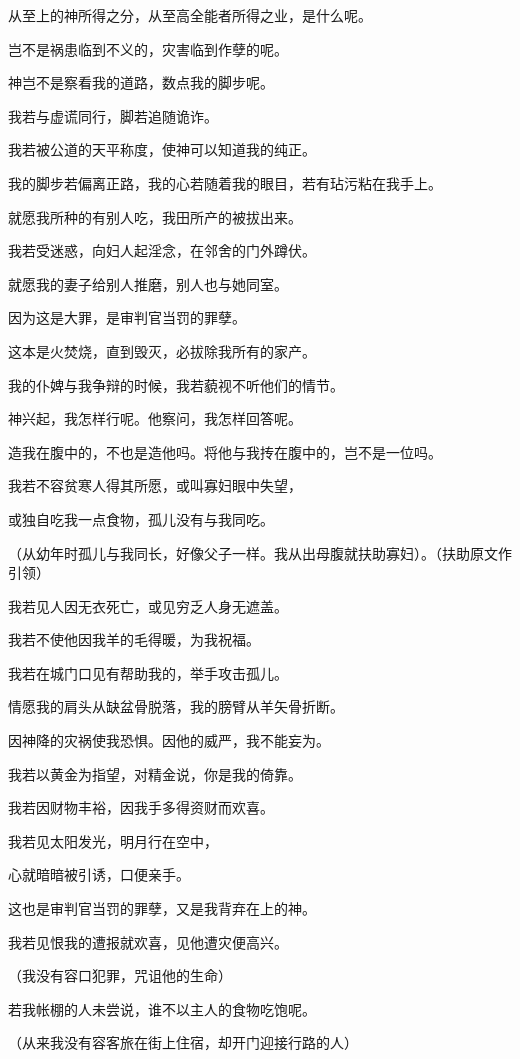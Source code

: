 \documentclass[12pt,oneside]{book}
\begin{document}
从至上的神所得之分，从至高全能者所得之业，是什么呢。

岂不是祸患临到不义的，灾害临到作孽的呢。

神岂不是察看我的道路，数点我的脚步呢。

我若与虚谎同行，脚若追随诡诈。

我若被公道的天平称度，使神可以知道我的纯正。

我的脚步若偏离正路，我的心若随着我的眼目，若有玷污粘在我手上。

就愿我所种的有别人吃，我田所产的被拔出来。

我若受迷惑，向妇人起淫念，在邻舍的门外蹲伏。

就愿我的妻子给别人推磨，别人也与她同室。

因为这是大罪，是审判官当罚的罪孽。

这本是火焚烧，直到毁灭，必拔除我所有的家产。

我的仆婢与我争辩的时候，我若藐视不听他们的情节。

神兴起，我怎样行呢。他察问，我怎样回答呢。

造我在腹中的，不也是造他吗。将他与我抟在腹中的，岂不是一位吗。

我若不容贫寒人得其所愿，或叫寡妇眼中失望，

或独自吃我一点食物，孤儿没有与我同吃。

（从幼年时孤儿与我同长，好像父子一样。我从出母腹就扶助寡妇）。（扶助原文作引领）

我若见人因无衣死亡，或见穷乏人身无遮盖。

我若不使他因我羊的毛得暖，为我祝福。

我若在城门口见有帮助我的，举手攻击孤儿。

情愿我的肩头从缺盆骨脱落，我的膀臂从羊矢骨折断。

因神降的灾祸使我恐惧。因他的威严，我不能妄为。

我若以黄金为指望，对精金说，你是我的倚靠。

我若因财物丰裕，因我手多得资财而欢喜。

我若见太阳发光，明月行在空中，

心就暗暗被引诱，口便亲手。

这也是审判官当罚的罪孽，又是我背弃在上的神。

我若见恨我的遭报就欢喜，见他遭灾便高兴。

（我没有容口犯罪，咒诅他的生命）

若我帐棚的人未尝说，谁不以主人的食物吃饱呢。

（从来我没有容客旅在街上住宿，却开门迎接行路的人）
\end{document}
